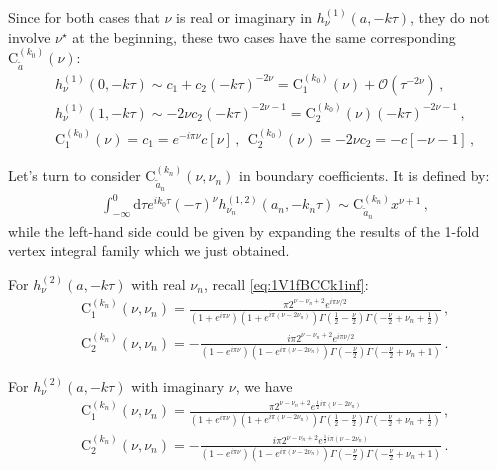 \documentclass[a4paper,11pt]{article}
\newcommand{\nn}{\nonumber}
\newcommand{\nd}{\mathrm{d}}
\begin{document}
Since for both cases that   $\nu$ is  real or  imaginary in  $h^{(1)}_{\nu}(a,-k\tau)$, they do not involve $\nu^\star$ at the beginning, these two cases have the same corresponding $\text{C}_{\tilde{a}}^{(k_0)}(\nu)$:
\begin{align}
&h_{\nu}^{(1)}(0,-k\tau)\sim c_1 +  c_2 (-k\tau)^{-2\nu}  = \text{C}_1^{(k_0)}(\nu)  +  \mathcal{O}(\tau^{-2\nu})   \, , \nn\\
&h_{\nu}^{({1})}(1,-k\tau)\sim -2\nu c_2 (-k\tau)^{-2\nu-1}=\text{C}_2^{(k_0)}(\nu) (-k\tau)^{-2\nu-1}\, ,\nn\\
&\text{C}_1^{(k_0)}(\nu) = c_1=e^{-i\pi\nu}c[\nu] \, , ~~\text{C}_2^{(k_0)}(\nu) = -2\nu c_2=-c[-\nu-1] \, , \label{eq:expandha1}
\end{align}

Let's turn to consider $\text{C}_{\tilde{a}_n}^{(k_n)}(\nu,\nu_n)$ in boundary coefficients. It is defined by:
\begin{align}
& \int_{-\infty}^0 \nd \tau e^{ i k_0 \tau} (-\tau)^{\nu} h^{(1,2)}_{\nu_n}(a_n,-k_n\tau)\sim \text{C}_{\tilde{a}_n}^{(k_n)} x^{\nu+1} \, ,
\end{align}
while the left-hand side could be given by expanding the results of the 1-fold vertex integral family which we just obtained. 

For  $h^{(2)}_\nu(a,-k\tau)$ with real $\nu_n$, recall \eqref{eq:1V1fBCCk1inf}:
\begin{align}
&\text{C}_1^{(k_n)}(\nu,\nu_n) =\frac{\pi  2^{\nu-\nu _n+2} e^{i \pi \nu/2 } }
{ \left(1+e^{i \pi  \nu}\right)
\left(1+e^{i \pi  \left(\nu-2 \nu_n\right)}\right) 
\Gamma \left(\frac{1}{2}-\frac{\nu}{2}\right)
\Gamma\left(-\frac{\nu}{2}+\nu_n+\frac{1}{2}\right)}  \,,\nn\\
&\text{C}_2^{(k_n)}(\nu,\nu_n) =-\frac{i \pi  2^{\nu-\nu _n+2} e^{i \pi \nu /2} }
{\left(1-e^{i \pi  \nu}\right)
\left(1-e^{i \pi  \left(\nu-2 \nu_n\right)}\right) 
\Gamma \left(-\frac{\nu}{2}\right) 
\Gamma\left(-\frac{\nu}{2}+\nu_n+1\right)} \, . \label{eq:1Vkninfh2R}
\end{align}

For  $h^{(2)}_\nu(a,-k\tau)$ with imaginary $\nu$, we have
\begin{align}
&\text{C}_1^{(k_n)}(\nu,\nu_n) =\frac{\pi  2^{\nu -\nu _n+2} e^{\frac{1}{2} i \pi  \left(\nu -2 \nu _n\right)}}{\left(1+e^{i \pi  \nu }\right) \left(1+e^{i \pi ( \nu-2\nu_n) }\right) 
\Gamma\left(\frac{1}{2}-\frac{\nu }{2}\right)  
\Gamma \left(-\frac{\nu }{2}+\nu_n+\frac{1}{2}\right)}  \,,\nn\\
&\text{C}_2^{(k_n)}(\nu,\nu_n) =-\frac{ i \pi  2^{\nu -\nu _n+2} e^{\frac{1}{2} i \pi  \left(\nu -2\nu _n\right)}}
{\left(1-e^{i \pi  \nu }\right)
\left(1-e^{i \pi  \left(\nu -2 \nu _n\right)}\right) 
\Gamma \left(-\frac{\nu }{2}\right)
\Gamma \left(-\frac{\nu }{2}+\nu _n+1\right)} \, . \label{eq:1Vkninfh2I}
\end{align}
\end{document}
